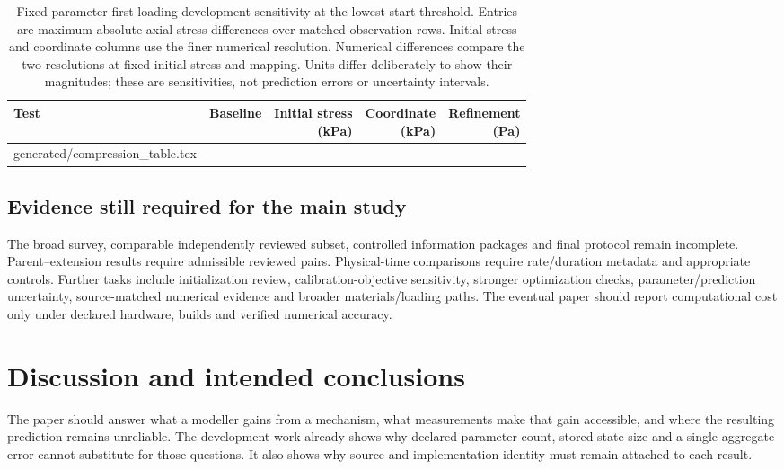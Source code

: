 \documentclass[11pt,a4paper]{article}
\begin{document}
\begin{table}[htbp]
\centering\small
\caption{Fixed-parameter first-loading development sensitivity at the lowest start threshold. Entries are maximum absolute axial-stress differences over matched observation rows. Initial-stress and coordinate columns use the finer numerical resolution. Numerical differences compare the two resolutions at fixed initial stress and mapping. Units differ deliberately to show their magnitudes; these are sensitivities, not prediction errors or uncertainty intervals.}
\label{tab:compression}
\begin{tabular}{l l r r r}
\toprule
Test & Baseline & \shortstack{Initial stress\\(kPa)} & \shortstack{Coordinate\\(kPa)} & \shortstack{Refinement\\(Pa)}\\
\midrule
{} generated/compression_table.tex
\bottomrule
\end{tabular}
\end{table}

\subsection{Evidence still required for the main study}
The broad survey, comparable independently reviewed subset, controlled information packages and final protocol remain incomplete. Parent--extension results require admissible reviewed pairs. Physical-time comparisons require rate/duration metadata and appropriate controls. Further tasks include initialization review, calibration-objective sensitivity, stronger optimization checks, parameter/prediction uncertainty, source-matched numerical evidence and broader materials/loading paths. The eventual paper should report computational cost only under declared hardware, builds and verified numerical accuracy.

\section{Discussion and intended conclusions}
The paper should answer what a modeller gains from a mechanism, what measurements make that gain accessible, and where the resulting prediction remains unreliable. The development work already shows why declared parameter count, stored-state size and a single aggregate error cannot substitute for those questions. It also shows why source and implementation identity must remain attached to each result.
\end{document}
